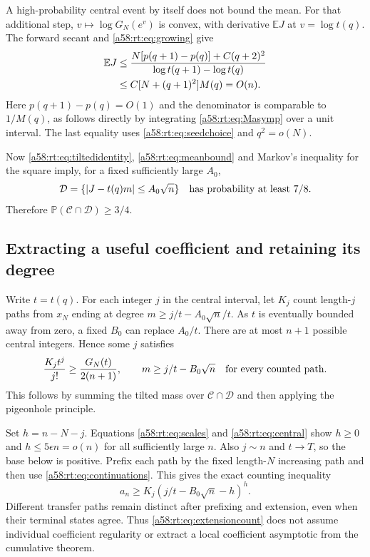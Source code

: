 \documentclass[11pt,letterpaper]{article}
\theoremstyle{remark}
\newcommand{\E}{\mathbb E}
\newcommand{\Pp}{\mathbb P}
\begin{document}
A high-probability central event by itself does not bound the mean.
For that additional step, $v\mapsto\log G_N(e^v)$ is convex, with
derivative $\E J$ at $v=\log t(q)$. The forward secant and
\eqref{a58:rt:eq:growing} give
\begin{align}
 \E J
 &\le\frac{N[p(q+1)-p(q)]+C(q+2)^2}
               {\log t(q+1)-\log t(q)}\notag\\
 &\le C[N+(q+1)^2]M(q)=O(n).\label{a58:rt:eq:meanbound}
\end{align}
Here $p(q+1)-p(q)=O(1)$ and the denominator is comparable to $1/M(q)$,
as follows directly by integrating \eqref{a58:rt:eq:Masymp} over a unit interval.
The last equality uses \eqref{a58:rt:eq:seedchoice} and $q^2=o(N)$.

Now \eqref{a58:rt:eq:tiltedidentity}, \eqref{a58:rt:eq:meanbound} and Markov's inequality
for the square imply, for a fixed sufficiently large $A_0$,
\begin{equation}\label{a58:rt:eq:degreeevent}
 \mathcal D=\{|J-t(q)m|\le A_0\sqrt n\}
 \quad\hbox{has probability at least }7/8.
\end{equation}
Therefore $\Pp(\mathcal C\cap\mathcal D)\ge3/4$.

\subsection{Extracting a useful coefficient and retaining its degree}
Write $t=t(q)$. For each integer $j$ in the central interval, let $K_j$
count length-$j$ paths from $x_N$ ending at degree
$m\ge j/t-A_0\sqrt n/t$. As $t$ is eventually bounded away from zero,
a fixed $B_0$ can replace $A_0/t$. There are at most $n+1$ possible
central integers. Hence some $j$ satisfies
\begin{equation}\label{a58:rt:eq:goodmass}
 \frac{K_jt^j}{j!}\ge\frac{G_N(t)}{2(n+1)},\qquad
 m\ge j/t-B_0\sqrt n
 \quad\hbox{for every counted path}.
\end{equation}
This follows by summing the tilted mass over $\mathcal C\cap\mathcal D$
and then applying the pigeonhole principle.

Set $h=n-N-j$. Equations \eqref{a58:rt:eq:scales} and \eqref{a58:rt:eq:central} show
$h\ge0$ and $h\le5\epsilon n=o(n)$ for all sufficiently large $n$.
Also $j\sim n$ and $t\to T$, so the base below is positive.
Prefix each path by the fixed length-$N$ increasing path and then use
\eqref{a58:rt:eq:continuations}. This gives the exact counting inequality
\begin{equation}\label{a58:rt:eq:extensioncount}
 a_n\ge K_j\left(j/t-B_0\sqrt n-h\right)^h.
\end{equation}
Different transfer paths remain distinct after prefixing and extension,
even when their terminal states agree. Thus \eqref{a58:rt:eq:extensioncount}
does not assume individual coefficient regularity or extract a local
coefficient asymptotic from the cumulative theorem.
\end{document}
